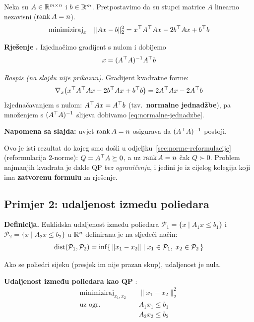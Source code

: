 Neka su $A \in \mathbb{R}^{m\times n}$ i $b \in \mathbb{R}^m$. Pretpostavimo da su stupci
matrice $A$ linearno nezavisni ($\operatorname{rank} A = n$).
\[
\text{minimiziraj}_x \quad \|Ax - b\|_2^2 = x^{\top} A^{\top} Ax - 2b^{\top} Ax + b^{\top} b
\]

\textbf{Rješenje} \textbf{.} Izjednačimo gradijent s nulom i dobijemo
\begin{equation}
\label{eq:normalne-jednadzbe}
x = (A^{\top} A)^{-1}A^{\top} b
\end{equation}

\emph{Raspis (na slajdu nije prikazan).} Gradijent kvadratne forme:
\[
\nabla_x\big(x^{\top} A^{\top} Ax - 2b^{\top} Ax + b^{\top} b\big) = 2A^{\top} Ax - 2A^{\top} b
\]
Izjednačavanjem s nulom: $A^{\top} Ax = A^{\top} b$ (tzv.\ \textbf{normalne jednadžbe}),
pa množenjem s $(A^{\top} A)^{-1}$ slijeva dobivamo \eqref{eq:normalne-jednadzbe}.
\checkmark

\textbf{Napomena sa slajda:} uvjet $\operatorname{rank} A = n$ osigurava da $(A^{\top} A)^{-1}$
postoji.

\begin{napomena}
Ovo je isti rezultat do kojeg smo došli u odjeljku~\ref{sec:norme-reformulacije} (reformulacija
2-norme): $Q = A^{\top} A \succeq 0$, a uz $\operatorname{rank} A = n$ čak $Q \succ 0$. Problem
najmanjih kvadrata je dakle QP \emph{bez ograničenja}, i jedini je iz cijelog
kolegija koji ima \textbf{zatvorenu formulu} za rješenje.
\end{napomena}

\subsection{Primjer 2: udaljenost između poliedara}

\textbf{Definicija.} Euklidska udaljenost između poliedara
$\mathcal{P}_1 = \{x \mid A_1x \le b_1\}$ i
$\mathcal{P}_2 = \{x \mid A_2x \le b_2\}$ u $\mathbb{R}^n$ definirana je na sljedeći
način:
\[
\operatorname{dist}(\mathcal{P}_1,\mathcal{P}_2)
= \inf\{\, \|x_1 - x_2\| \mid x_1 \in \mathcal{P}_1,\; x_2 \in \mathcal{P}_2 \,\}
\]

Ako se poliedri sijeku (presjek im nije prazan skup), udaljenost je nula.

\textbf{Udaljenost između poliedara kao QP} :
\[
\begin{aligned}
\text{minimiziraj}_{x_1,x_2} \quad & \|x_1 - x_2\|_2^2 \\
\text{uz ogr.} \quad & A_1x_1 \le b_1 \\
& A_2x_2 \le b_2
\end{aligned}
\]


